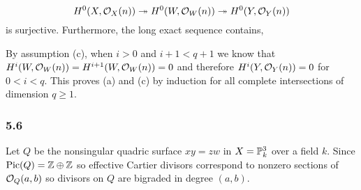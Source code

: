 \documentclass[12pt]{article}
\begin{document}
\[ H^0(X, \struct{X}(n)) \onto H^0(W, \struct{W}(n)) \onto H^0(Y, \struct{Y}(n)) \]
is surjective. Furthermore, the long exact sequence contains,
\begin{center}
\end{center}
By assumption (c), when $i > 0$ and $i+1 < q+1$ we know that $H^i(W, \struct{W}(n)) = H^{i+1}(W, \struct{W}(n)) = 0$ and therefore $H^i(Y, \struct{Y}(n)) = 0$ for $0 < i < q$. This proves (a) and (c) by induction for all complete intersections of dimension $q \ge 1$.  

\subsubsection{5.6}

Let $Q$ be the nonsingular quadric surface $xy = zw$ in $X = \P^3_k$ over a field $k$. Since $\Pic{Q} = \Z \oplus \Z$ so effective Cartier divisors correspond to nonzero sections of $\struct{Q}(a,b)$ so divisors on $Q$ are bigraded in degree $(a,b)$.
\end{document}
